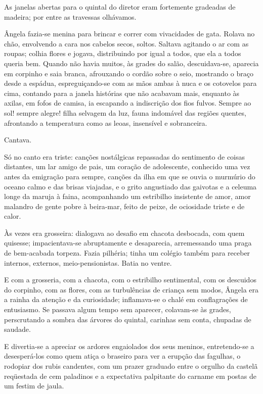 As janelas abertas para o quintal do diretor eram
fortemente gradeadas de madeira; por entre as travessas olhávamos.

Ângela fazia{}-se menina para brincar e correr com vivacidades de gata.
Rolava no chão, envolvendo a cara nos cabelos secos, soltos. Saltava
agitando o ar com as roupas; colhia flores e jogava, distribuindo por
igual a todos, que ela a todos queria bem. Quando não havia muitos, às
grades do salão, descuidava{}-se, aparecia em corpinho e saia branca,
afrouxando o cordão sobre o seio, mostrando o braço desde a espádua,
espreguiçando{}-se com as mãos ambas à nuca e os cotovelos para cima,
contando para a janela histórias que não acabavam mais, enquanto às
axilas, em fofos de camisa, ia escapando a indiscrição dos fios fulvos.
Sempre ao sol! sempre alegre! filha selvagem da luz, fauna indomável
das regiões quentes, afrontando a temperatura como as leoas, insensível
e sobranceira. 

Cantava. 

Só no canto era triste: canções nostálgicas
repassadas do sentimento de coisas distantes, um lar amigo de pais, um
coração de adolescente, conhecido uma vez antes da emigração para
sempre, canções da ilha em que se ouvia o murmúrio do oceano calmo e
das brisas viajadas, e o grito angustiado das gaivotas e a celeuma
longe da maruja à faina, acompanhando um estribilho insistente de amor,
amor malandro de gente pobre à beira{}-mar, feito de peixe, de
ociosidade triste e de calor. 

Às vezes era grosseira: dialogava ao
desafio em chacota desbocada, com quem quisesse; impacientava{}-se
abruptamente e desaparecia, arremessando uma praga de bem{}-acabada
torpeza. Fazia pilhéria; tinha um colégio também para receber internos,
externos, meio{}-pensionistas. Batia no ventre. 

E com a grosseria, com a chacota, com o estribilho sentimental,
com os descuidos do corpinho, com as flores, com as turbulências de
criança sem modos, Ângela era a rainha da atenção e da curiosidade;
inflamava{}-se o chalé em conflagrações de entusiasmo. Se passava algum
tempo sem aparecer, colavam{}-se às grades, perscrutando a sombra das
árvores do quintal, carinhas sem conta, chupadas de saudade. 

E divertia{}-se a apreciar os ardores engaiolados dos seus meninos,
entretendo{}-se a desesperá{}-los como quem atiça o braseiro para ver a
erupção das fagulhas, o rodopiar dos rubis candentes, com um prazer
graduado entre o orgulho da castelã reqüestada de cem paladinos e a
expectativa palpitante do carname em postas de um festim de jaula. 

